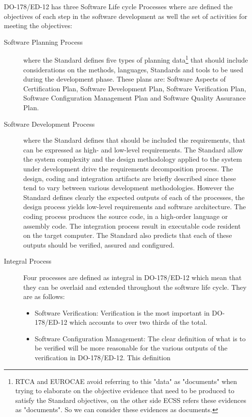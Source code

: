 {DO-178/ED-12 has three Software Life cycle Processes where are defined the objectives of each step in the software development as well
the set of activities for meeting the objectives:
\begin{description}
\item[Software Planning Process] where the Standard defines five types of planning data\footnote{\ac{RTCA} and \ac{EUROCAE} avoid referring to this "data" as
"documents" when trying to elaborate on the objective evidence that need to be produced to satisfy the Standard objectives\cite{avionics}, on the other side \ac{ECSS} refers
these evidences as "documents". So we can consider these evidences as documents.} that should include
considerations on the methods, languages, Standards and tools to be used during the development phase. These plans are: Software Aspects of
Certification Plan,
Software Development Plan, Software Verification Plan, Software Configuration Management Plan and Software Quality Assurance Plan.
\item[Software Development Process] where the Standard defines that should be included the requirements, that can be
expressed as high- and low-level requirements\cite{avionics,ed-12b}. The Standard allow the system complexity and the design methodology applied to the system under development
drive the requirements decomposition process. The design, coding and integration artifacts are briefly described since these tend to vary between various development methodologies.
However the Standard defines clearly the expected outputs of each of the processes, the design process yields low-level requirements and software architecture.
The coding process produces the source code, in a high-order language or assembly code. The integration process result in executable code
resident on the target computer. The Standard also predicts that each of these outputs should be verified, assured and configured.
\item[Integral Process] Four processes are defined as integral in DO-178/ED-12 which
mean that they can be overlaid and extended throughout the
software life cycle. They are as follows:
\begin{itemize}
\item Software Verification: Verification is the most important
in DO-178/ED-12 which accounts to over two thirds of the total.
\item Software Configuration Management: The clear definition
of what is to be verified will be more reasonable for the
various outputs of the verification in DO-178/ED-12. This definition

\end{itemize}
\end{description}}
